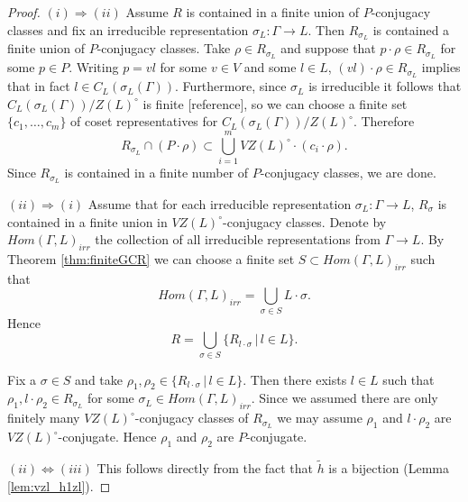 \begin{proof}\quad

  $(i) \Rightarrow (ii)$ Assume $R$ is contained in a finite union of $P$-conjugacy classes and fix an irreducible representation $\sigma_L : \Gamma \rightarrow L$. Then $R_{\sigma_L}$ is contained a finite union of $P$-conjugacy classes. Take $\rho \in R_{\sigma_L}$ and suppose that $p \cdot \rho \in R_{\sigma_L}$ for some $p \in P$. Writing $p = vl$ for some $v \in V$ and some $l \in L$, $(vl) \cdot \rho \in R_{\sigma_L}$ implies that in fact $l \in C_L(\sigma_L(\Gamma))$. Furthermore, since $\sigma_L$ is irreducible it follows that $C_L(\sigma_L(\Gamma))/Z(L)^\circ$ is finite [reference], so we can choose a finite set $\{c_1, \ldots, c_m\}$ of coset representatives for $C_L(\sigma_L(\Gamma))/Z(L)^\circ$. Therefore
  \begin{displaymath}
    R_{\sigma_L} \cap (P \cdot \rho) \subset \bigcup_{i = 1}^{m} VZ(L)^\circ \cdot \left( c_i \cdot \rho \right).
  \end{displaymath}
  Since $R_{\sigma_L}$ is contained in a finite number of $P$-conjugacy classes, we are done.

  $(ii) \Rightarrow (i)$ Assume that for each irreducible representation $\sigma_L : \Gamma \rightarrow L$, $R_{\sigma}$ is contained in a finite union in $VZ(L)^\circ$-conjugacy classes. Denote by $Hom(\Gamma, L)_{irr}$ the collection of all irreducible representations from $\Gamma \rightarrow L$. By Theorem \ref{thm:finiteGCR} we can choose a finite set $S \subset Hom(\Gamma, L)_{irr}$ such that
  \begin{displaymath}
    Hom(\Gamma, L)_{irr} = \bigcup_{\sigma \in S} L \cdot \sigma.
  \end{displaymath}
  Hence 
  \begin{displaymath}
    R = \bigcup_{\sigma \in S} \{R_{l \cdot \sigma} \,|\, l \in L \}.
  \end{displaymath}

  Fix a $\sigma \in S$ and take $\rho_1, \rho_2 \in \{R_{l \cdot \sigma} \,|\, l \in L\}$. Then there exists $l \in L$ such that $\rho_1, l \cdot \rho_2 \in R_{\sigma_L}$ for some $\sigma_L \in Hom(\Gamma, L)_{irr}$. Since we assumed there are only finitely many $VZ(L)^\circ$-conjugacy classes of $R_{\sigma_L}$ we may assume $\rho_1$ and $l \cdot \rho_2$ are $VZ(L)^\circ$-conjugate. Hence $\rho_1$ and $\rho_2$ are $P$-conjugate.

  $(ii) \Leftrightarrow (iii)$ This follows directly from the fact that $\tilde{h}$ is a bijection (Lemma \ref{lem:vzl_h1zl}).

\end{proof}

